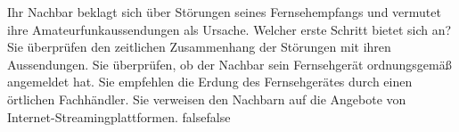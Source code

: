     {Ihr Nachbar beklagt sich über Störungen seines Fernsehempfangs und vermutet ihre Amateurfunkaussendungen als Ursache. Welcher erste Schritt bietet sich an?}
    {Sie überprüfen den zeitlichen Zusammenhang der Störungen mit ihren Aussendungen.}
    {Sie überprüfen, ob der Nachbar sein Fernsehgerät ordnungsgemäß angemeldet hat.}
    {Sie empfehlen die Erdung des Fernsehgerätes durch einen örtlichen Fachhändler.}
    {Sie verweisen den Nachbarn auf die Angebote von Internet-Streamingplattformen.}
    {false}{false}